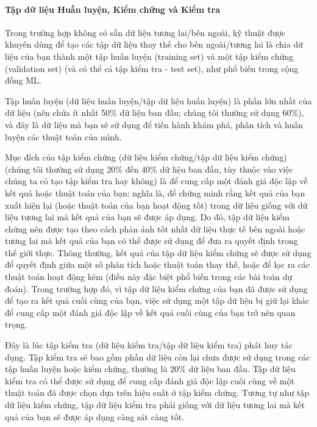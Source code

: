 \paragraph{Tập dữ liệu Huấn luyện, Kiểm chứng và Kiểm tra}

Trong trường hợp không có sẵn dữ liệu tương lai/bên ngoài, kỹ thuật được khuyên dùng để tạo các tập dữ liệu thay thế cho bên ngoài/tương lai là chia dữ liệu của bạn thành một tập huấn luyện (training set) và một tập kiểm chứng (validation set) (và có thể cả tập kiểm tra - test set), như phổ biến trong cộng đồng ML.

Tập huấn luyện (dữ liệu huấn luyện/tập dữ liệu huấn luyện) là phần lớn nhất của dữ liệu (nên chứa ít nhất 50\% dữ liệu ban đầu; chúng tôi thường sử dụng 60\%), và đây là dữ liệu mà bạn sẽ sử dụng để tiến hành khám phá, phân tích và huấn luyện các thuật toán của mình.

Mục đích của tập kiểm chứng (dữ liệu kiểm chứng/tập dữ liệu kiểm chứng) (chúng tôi thường sử dụng 20\% đến 40\% dữ liệu ban đầu, tùy thuộc vào việc chúng ta có tạo tập kiểm tra hay không) là để cung cấp một đánh giá độc lập về kết quả hoặc thuật toán của bạn: nghĩa là, để chứng minh rằng kết quả của bạn xuất hiện lại (hoặc thuật toán của bạn hoạt động tốt) trong dữ liệu giống với dữ liệu tương lai mà kết quả của bạn sẽ được áp dụng. Do đó, tập dữ liệu kiểm chứng nên được tạo theo cách phản ánh tốt nhất dữ liệu thực tế bên ngoài hoặc tương lai mà kết quả của bạn có thể được sử dụng để đưa ra quyết định trong thế giới thực. Thông thường, kết quả của tập dữ liệu kiểm chứng sẽ được sử dụng để quyết định giữa một số phân tích hoặc thuật toán thay thế, hoặc để lọc ra các thuật toán hoạt động kém (điều này đặc biệt phổ biến trong các bài toán dự đoán). Trong trường hợp đó, vì tập dữ liệu kiểm chứng của bạn đã được sử dụng để tạo ra kết quả cuối cùng của bạn, việc sử dụng một tập dữ liệu bị giữ lại khác để cung cấp một đánh giá độc lập về kết quả cuối cùng của bạn trở nên quan trọng.

Đây là lúc tập kiểm tra (dữ liệu kiểm tra/tập dữ liệu kiểm tra) phát huy tác dụng. Tập kiểm tra sẽ bao gồm phần dữ liệu còn lại chưa được sử dụng trong các tập huấn luyện hoặc kiểm chứng, thường là 20\% dữ liệu ban đầu. Tập dữ liệu kiểm tra có thể được sử dụng để cung cấp đánh giá độc lập cuối cùng về một thuật toán đã được chọn dựa trên hiệu suất ở tập kiểm chứng. Tương tự như tập dữ liệu kiểm chứng, tập dữ liệu kiểm tra phải giống với dữ liệu tương lai mà kết quả của bạn sẽ được áp dụng càng sát càng tốt.

